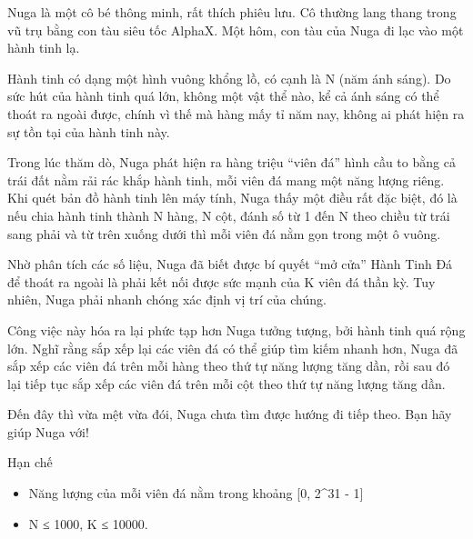 Nuga là một cô bé thông minh, rất thích phiêu lưu. Cô thường lang thang trong vũ trụ bằng con tàu siêu tốc AlphaX. Một hôm, con tàu của Nuga đi lạc vào một hành tinh lạ.  

   Hành tinh có dạng một hình vuông khổng lồ, có cạnh là N (năm ánh sáng). Do sức hút của hành tinh quá lớn, không một vật thể nào, kể cả ánh sáng có thể thoát ra ngoài được, chính vì thế mà hàng mấy tỉ năm nay, không ai phát hiện ra sự tồn tại của hành tinh này.  

   Trong lúc thăm dò, Nuga phát hiện ra hàng triệu “viên đá” hình cầu to bằng cả trái đất nằm rải rác khắp hành tinh, mỗi viên đá mang một năng lượng riêng. Khi quét bản đồ hành tinh lên máy tính, Nuga thấy một điều rất đặc biệt, đó là nếu chia hành tinh thành N hàng, N cột, đánh số từ 1 đến N theo chiều từ trái sang phải và từ trên xuống dưới thì mỗi viên đá nằm gọn trong một ô vuông.  

   Nhờ phân tích các số liệu, Nuga đã biết được bí quyết “mở cửa” Hành Tinh Đá để thoát ra ngoài là phải kết nối được sức mạnh của K viên đá thần kỳ. Tuy nhiên, Nuga phải nhanh chóng xác định vị trí của chúng.  

   Công việc này hóa ra lại phức tạp hơn Nuga tưởng tượng, bởi hành tinh quá rộng lớn. Nghĩ rằng sắp xếp lại các viên đá có thể giúp tìm kiếm nhanh hơn, Nuga đã sắp xếp các viên đá trên mỗi hàng theo thứ tự năng lượng tăng dần, rồi sau đó lại tiếp tục sắp xếp các viên đá trên mỗi cột theo thứ tự năng lượng tăng dần.  

   Đến đây thì vừa mệt vừa đói, Nuga chưa tìm được hướng đi tiếp theo. Bạn hãy giúp Nuga với!  

Hạn chế
\begin{itemize}
	\item     Năng lượng của mỗi viên đá nằm trong khoảng [0, 2^31 - 1]   
	\item     N ≤ 1000, K ≤ 10000.   
\end{itemize}